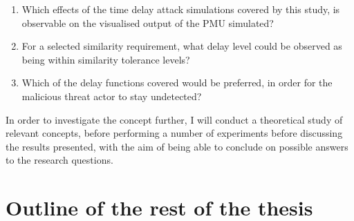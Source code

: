 \begin{enumerate}
    \item Which effects of the time delay attack simulations covered by this study, is observable on the visualised output of the PMU simulated?
    \item For a selected similarity requirement, what delay level could be observed as being within similarity tolerance levels?
    \item Which of the delay functions covered would be preferred, in order for the malicious threat actor to stay undetected?    

\end{enumerate}

In order to investigate the concept further, I will conduct a theoretical study of relevant concepts, before performing a number of experiments before discussing the results presented, with the aim of being able to conclude on possible answers to the research questions. 



\section{Outline of the rest of the thesis}



